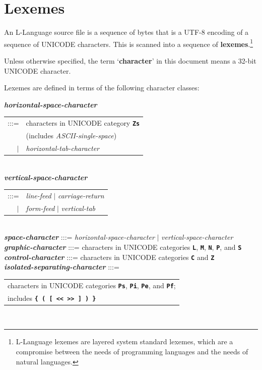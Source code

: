 \documentclass[12pt]{article}
\newcommand{\TT}[1]{{\tt \bfseries #1}}
\newcommand{\key}[1]{{\rm \bfseries #1}}
\newcommand{\emkey}[1]{{\em \bfseries #1}}
\newcommand{\skey}[2]{{\rm \bfseries #1#2}}
\newenvironment{indpar}[1][0.3in]%
	{\begin{list}{}%
		     {\setlength{\itemsep}{0in}%
		      \setlength{\topsep}{0in}%
		      \setlength{\parsep}{1ex}%
		      \setlength{\labelwidth}{#1}%
		      \setlength{\leftmargin}{#1}%
		      \addtolength{\leftmargin}{\labelsep}}%
	 \item}%
	{\end{list}}
\begin{document}
\section{Lexemes}
\label{LEXEMES}

An L-Language source file is a sequence of bytes that is a UTF-8 encoding
of a sequence of UNICODE characters.  This is scanned into a sequence
of \skey{lexeme}s.\footnote{
L-Language lexemes are layered system standard
lexemes, which are a compromise between the needs of programming languages
and the needs of natural languages.}

Unless otherwise specified, the term `\key{character}' in this
document means a 32-bit UNICODE character.

Lexemes are defined in terms of
the following character classes:

\begin{indpar}
\emkey{horizontal-space-character}
    \begin{tabular}[t]{rl}
    :::= & characters in UNICODE category \TT{Zs} \\
         & (includes {\em ASCII-single-space}) \\
    $|$  & {\em horizontal-tab-character}
    \end{tabular}
\\
\emkey{vertical-space-character}
    \begin{tabular}[t]{rl}
    :::= & {\em line-feed} $|$ {\em carriage-return} \\
    $|$ & {\em form-feed} $|$ {\em vertical-tab}
    \end{tabular}
\\
\emkey{space-character} :::= {\em horizontal-space-character}
                        $|$ {\em vertical-space-character}
\\[1ex]
\emkey{graphic-character} :::= characters in UNICODE categories
                              \TT{L}, \TT{M}, \TT{N}, \TT{P}, and \TT{S}
\\
\emkey{control-character} :::=
	characters in UNICODE categories \TT{C} and \TT{Z}
\\[1ex]
\emkey{isolated-separating-character} :::= \\
\hspace*{0.5in}
    \begin{tabular}[t]{l}
    characters in UNICODE categories \TT{Ps}, \TT{Pi}, \TT{Pe},
    and \TT{Pf}; \\
    includes \TT{\{ ( [ << >> ] ) \}}
    \end{tabular}
\\

\end{indpar}
\end{document}
